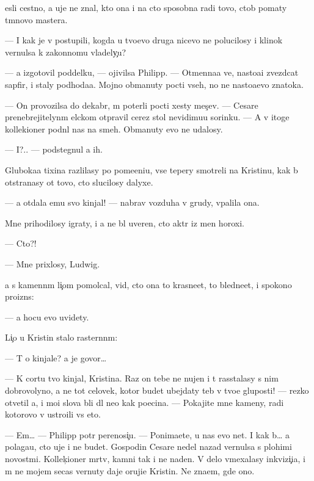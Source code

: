 \documentclass[10pt]{book}
\begin{document}
{\Y}esli cestno, {\y}a uje ne znal, kto ona i na cto sposobna radi tovo, ctob{\yi} po{\y}maty t{\e}mnovo mastera.

— I kak je v{\yi} postupili, kogda u tvo{\y}evo druga nicevo ne polucilosy i klinok vernulsa k zakonnomu vladely{\c}u?

— {\Y}a izgotovil poddelku, — ojivilsa Philipp. — Otmenna{\y}a ve{\x}, nasto{\y}a{\x}i{\y} zvezd\-ca\-t{\yi}{\y} sapfir, i staly podhod{\ia}{\x}a{\y}a. Mojno obmanuty pocti vseh, no ne nasto{\y}a{\x}evo znatoka.

— On provozilsa do dekabr{\ia}, m{\yi} poter{\ia}li pocti xesty mes{\ia}{\c}ev. — Cesare pre\-nebreji\-tely\-n{\yi}m {\x}elckom otpravil cerez stol nevidimu{\y}u sorinku. — A v itoge kollek\-{\c}ioner podn{\ia}l nas na smeh. Obmanuty {\y}evo ne udalosy.

— I?.. — podstegnul {\y}a ih.

Gluboka{\y}a tixina razlilasy po pome{\x}eni{\y}u, vse tepery smotreli na Kristinu, kak b{\yi} otstran{\ia}{\y}asy ot tovo, cto slucilosy dalyxe.

— {\Y}a otdala {\y}emu svo{\y} kinjal! — nabrav vozduha v grudy, v{\yi}palila ona.

Mne prihodilosy igraty, i {\y}a ne b{\yi}l uveren, cto akt{\e}r iz men{\ia} horoxi{\y}.

— Cto?!

— Mne pri\-xlosy, Ludwig.

{\Y}a s kamenn{\yi}m li{\c}om pomolcal, vid{\ia}, cto ona to krasne{\y}et, to bledne{\y}et, i spo\-ko{\y}\-no proizn{\e}s:

— {\Y}a hocu {\y}evo uvidety.

Li{\c}o u Kristin{\yi} stalo raster{\ia}nn{\yi}m:

— T{\yi} o kinjale? {\Y}a je govor{\io}…

— K cortu tvo{\y} kinjal, Kristina. Raz on tebe ne nujen i t{\yi} rasstalasy s nim dobrovolyno, {\y}a ne tot celovek, kotor{\yi}{\y} budet ubejdaty teb{\ia} v tvo{\y}e{\y} gluposti! — rezko otvetil {\y}a, i mo{\y}i slova b{\yi}li dl{\ia} ne{\y}o kak po{\x}ecina. — Pokajite mne kameny, radi kotorovo v{\yi} ustro{\y}ili vs{\e} eto.

— Em… — Philipp pot{\e}r perenosi{\c}u. — Ponima{\y}ete, u nas {\y}evo net. I kak b{\yi}… {\y}a polaga{\y}u, cto uje i ne budet. Gospodin Cesare nedel{\io} nazad vernulsa s plohimi novost{\ia}mi. Kollek{\c}ioner m{\e}rtv, kamni tak i ne na{\y}den{\yi}. V delo vmexalasy inkvizi{\c}i{\y}a, i m{\yi} ne mojem se{\y}cas vernuty daje oruji{\y}e Kristin{\yi}. Ne zna{\y}em, gde ono.
\end{document}
